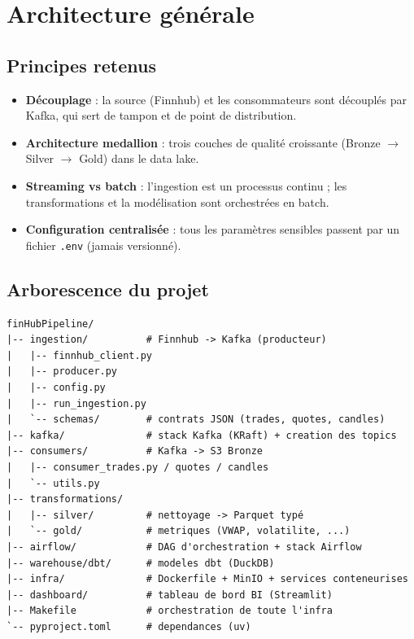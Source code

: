 \documentclass[11pt,a4paper]{article}
\newcommand{\code}[1]{\texttt{\small #1}}
\begin{document}
\section{Architecture générale}

\subsection{Principes retenus}

\begin{itemize}
  \item \textbf{Découplage} : la source (Finnhub) et les consommateurs sont
        découplés par Kafka, qui sert de tampon et de point de distribution.
  \item \textbf{Architecture medallion} : trois couches de qualité croissante
        (Bronze $\rightarrow$ Silver $\rightarrow$ Gold) dans le data lake.
  \item \textbf{Streaming vs batch} : l'ingestion est un processus continu ;
        les transformations et la modélisation sont orchestrées en batch.
  \item \textbf{Configuration centralisée} : tous les paramètres sensibles
        passent par un fichier \code{.env} (jamais versionné).
\end{itemize}

\subsection{Arborescence du projet}

\begin{lstlisting}
finHubPipeline/
|-- ingestion/          # Finnhub -> Kafka (producteur)
|   |-- finnhub_client.py
|   |-- producer.py
|   |-- config.py
|   |-- run_ingestion.py
|   `-- schemas/        # contrats JSON (trades, quotes, candles)
|-- kafka/              # stack Kafka (KRaft) + creation des topics
|-- consumers/          # Kafka -> S3 Bronze
|   |-- consumer_trades.py / quotes / candles
|   `-- utils.py
|-- transformations/
|   |-- silver/         # nettoyage -> Parquet typé
|   `-- gold/           # metriques (VWAP, volatilite, ...)
|-- airflow/            # DAG d'orchestration + stack Airflow
|-- warehouse/dbt/      # modeles dbt (DuckDB)
|-- infra/              # Dockerfile + MinIO + services conteneurises
|-- dashboard/          # tableau de bord BI (Streamlit)
|-- Makefile            # orchestration de toute l'infra
`-- pyproject.toml      # dependances (uv)
\end{lstlisting}
\end{document}
